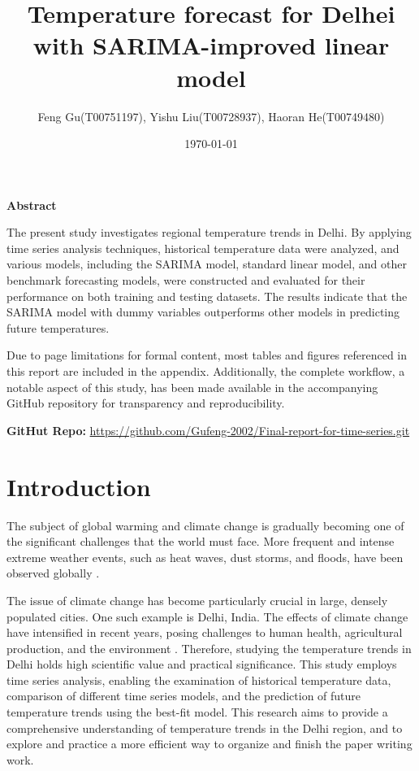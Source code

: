 \documentclass[12pt]{article}
\title{Temperature forecast for Delhei with SARIMA-improved linear model}
\author{Feng Gu(T00751197), Yishu Liu(T00728937), Haoran He(T00749480)}
\date{\today}
\begin{document}
\maketitle

\begin{center}
    \textbf{\large Abstract}
\end{center}

The present study investigates regional temperature trends in Delhi.
 By applying time series analysis techniques, historical temperature data were analyzed, and various models, 
 including the SARIMA model, standard linear model, and other benchmark forecasting models, 
 were constructed and evaluated for their performance on both training and testing datasets. 
 The results indicate that the SARIMA model with dummy variables outperforms other models in predicting 
 future temperatures. 

Due to page limitations for formal content, most tables and figures referenced in this report 
are included in the appendix. Additionally, the complete workflow, a notable aspect of this study, 
has been made available in the accompanying GitHub repository for transparency and reproducibility.

\textbf{GitHut Repo:} \href{https://github.com/Gufeng-2002/Final-report-for-time-series.git}
{https://github.com/Gufeng-2002/Final-report-for-time-series.git}



\section{Introduction}
\sloppy
The subject of global warming and climate change is gradually becoming one of the significant challenges 
that the world must face. More frequent and intense extreme weather events, such as heat waves, dust storms, 
and floods, have been observed globally \cite{dabhade2021}. 

The issue of climate change has become particularly crucial in large, densely populated cities. 
One such example is Delhi, India. The effects of climate change have intensified in recent years, 
posing challenges to human health, agricultural production, and the environment 
\cite{hussain2024}. 
Therefore, studying the temperature trends in Delhi holds high scientific value and practical significance. 
\sloppy
This study employs time series analysis, enabling the examination of historical temperature data,
comparison of different time series models, and the prediction of future temperature trends using the 
best-fit model. This research aims to provide a comprehensive understanding of temperature trends in the Delhi region,
and to explore and practice a more efficient way to organize and finish the paper writing work.
\end{document}
